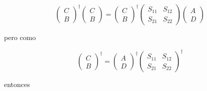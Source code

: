 \documentclass[12pt,a4paper]{article}
\begin{document}
\begin{enumerate}
    \begin{equation*}
        \left(\begin{matrix}
         C \\
         B
        \end{matrix}\right)^{\dagger}\left(\begin{matrix}
         C \\
         B
        \end{matrix}\right) = \left(\begin{matrix}
         C \\
         B
        \end{matrix}\right)^{\dagger} \left(\begin{matrix}
         S_{11} & S_{12} \\
         S_{21} & S_{22}
        \end{matrix}\right)
        \left(\begin{matrix}
         A \\
         D
        \end{matrix}\right)
    \end{equation*}
    
    pero como
    
    \begin{equation*}
        \left(\begin{matrix}
         C \\
         B
        \end{matrix}\right)^{\dagger} = 
        \left(\begin{matrix}
         A \\
         D
        \end{matrix}\right)^{\dagger}
        \left(\begin{matrix}
         S_{11} & S_{12} \\
         S_{21} & S_{22}
        \end{matrix}\right)^{\dagger}
    \end{equation*}
    
    entonces
    

\end{enumerate}
\end{document}
